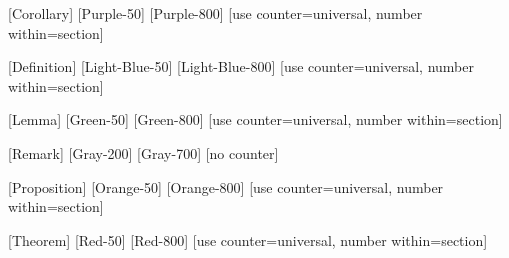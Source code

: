  [Corollary] [Purple-50] [Purple-800] 
[use counter=universal, number within=section]

\newenvironment{corollary}[1][] {\begin{Corollary}{#1}{}} {\end{Corollary}}

 [Definition] [Light-Blue-50] [Light-Blue-800]
[use counter=universal, number within=section]

\newenvironment{definition}[1][] {\begin{Definition}{#1}{}} {\end{Definition}}

\theoremstyle{definition}
\newtheorem*{Example}{\color{primary}Example}

\newenvironment{example}
{\begin{Example}}
{\hfill\ensuremath{\color{primary}\diamondsuit}\end{Example}}

 [Lemma] [Green-50] [Green-800]
[use counter=universal, number within=section]

\newenvironment{lemma}[1][] {\begin{Lemma}{#1}{}} {\end{Lemma}}

 [Remark] [Gray-200] [Gray-700] [no counter]

\newenvironment{remark}[1][] {\begin{Remark}{#1}{}} {\end{Remark}}

 [Proposition] [Orange-50] [Orange-800]
[use counter=universal, number within=section]

\newenvironment{proposition}[1][] {\begin{Proposition}{#1}{}} {\end{Proposition}}

 [Theorem] [Red-50] [Red-800]
[use counter=universal, number within=section]

